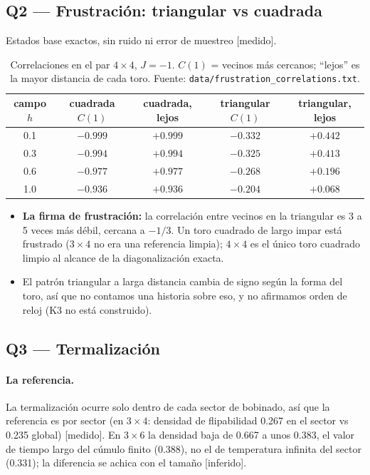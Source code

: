 \documentclass[11pt,a4paper]{article}
\newcommand{\code}[1]{\nolinkurl{#1}}
\begin{document}
\subsection{Q2 --- Frustraci\'on: triangular vs cuadrada}
Estados base exactos, sin ruido ni error de muestreo [medido].

\begin{table}[h]\centering\small
\caption{Correlaciones en el par $4\times4$, $J=-1$. $C(1)$ = vecinos m\'as cercanos; ``lejos'' es la
mayor distancia de cada toro. Fuente: \code{data/frustration\_correlations.txt}.}
\begin{tabular}{ccc|cc}
\toprule
campo $h$ & cuadrada $C(1)$ & cuadrada, lejos & triangular $C(1)$ & triangular, lejos\\
\midrule
0.1 & $-0.999$ & $+0.999$ & $-0.332$ & $+0.442$\\
0.3 & $-0.994$ & $+0.994$ & $-0.325$ & $+0.413$\\
0.6 & $-0.977$ & $+0.977$ & $-0.268$ & $+0.196$\\
1.0 & $-0.936$ & $+0.936$ & $-0.204$ & $+0.068$\\
\bottomrule
\end{tabular}
\end{table}
\begin{itemize}[leftmargin=1.4em]
  \item \textbf{La firma de frustraci\'on:} la correlaci\'on entre vecinos en la triangular es 3 a 5 veces
    m\'as d\'ebil, cercana a $-1/3$. Un toro cuadrado de largo impar est\'a frustrado ($3\times4$ no era
    una referencia limpia); $4\times4$ es el \'unico toro cuadrado limpio al alcance de la diagonalizaci\'on exacta.
  \item El patr\'on triangular a larga distancia cambia de signo seg\'un la forma del toro, as\'i que no
    contamos una historia sobre eso, y no afirmamos orden de reloj (K3 no est\'a construido).
\end{itemize}

\subsection{Q3 --- Termalizaci\'on}
\paragraph{La referencia.} La termalizaci\'on ocurre solo dentro de cada sector de bobinado, as\'i que la
referencia es por sector (en $3\times4$: densidad de flipabilidad 0.267 en el sector vs 0.235 global) [medido].
En $3\times6$ la densidad baja de 0.667 a unos 0.383, el valor de tiempo largo del c\'umulo finito (0.388), no el
de temperatura infinita del sector (0.331); la diferencia se achica con el tama\~no [inferido].
\end{document}
